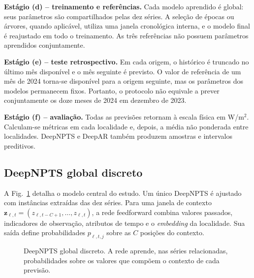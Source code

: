 \documentclass[10pt,conference,a4paper]{IEEEtran}
\begin{document}
\noindent\textbf{Estágio (d) -- treinamento e referências.} Cada modelo
aprendido é global: seus parâmetros são compartilhados pelas dez séries. A
seleção de épocas ou árvores, quando aplicável, utiliza uma janela cronológica
interna, e o modelo final é reajustado em todo o treinamento. As três
referências não possuem parâmetros aprendidos conjuntamente.

\noindent\textbf{Estágio (e) -- teste retrospectivo.} Em cada origem, o
histórico é truncado no último mês disponível e o mês seguinte é previsto. O
valor de referência de um mês de 2024 torna-se disponível para a origem
seguinte, mas os parâmetros dos modelos permanecem fixos. Portanto, o protocolo
não equivale a prever conjuntamente os doze meses de 2024 em dezembro de 2023.

\noindent\textbf{Estágio (f) -- avaliação.} Todas as previsões retornam à escala
física em W/m$^2$. Calculam-se métricas em cada localidade e, depois, a média
não ponderada entre localidades. DeepNPTS e DeepAR também produzem amostras e
intervalos preditivos.

\subsection{DeepNPTS global discreto}

A Fig.~\ref{fig:deepnpts} detalha o modelo central do estudo. Um único
DeepNPTS é ajustado com instâncias extraídas das dez séries. Para uma janela de
contexto $\mathbf z_{\ell,t}=(z_{\ell,t-C+1},\ldots,z_{\ell,t})$, a rede
feedforward combina valores passados, indicadores de observação, atributos de
tempo e o \textit{embedding} da localidade. Sua saída define probabilidades
$p_{\ell,t,j}$ sobre as $C$ posições do contexto.

\begin{figure}[!t]
\centering
{}
\caption{DeepNPTS global discreto. A rede aprende, nas séries relacionadas,
probabilidades sobre os valores que compõem o contexto de cada previsão.}
\label{fig:deepnpts}
\end{figure}
\end{document}
